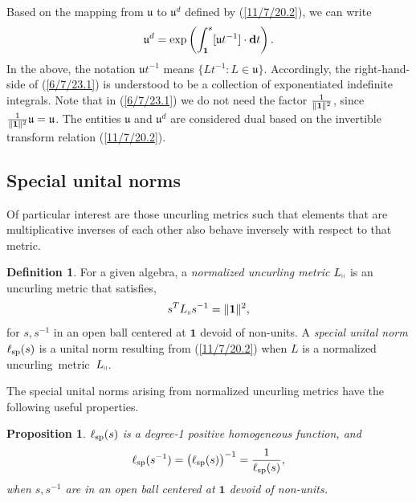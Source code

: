 \documentclass{amsart}
\newtheorem{proposition}[theorem]{Proposition}
\theoremstyle{definition}
\newtheorem{definition}[theorem]{Definition}
\numberwithin{theorem}{section}
\numberwithin{equation}{section}
\begin{document}
 Based on the mapping from $\mathfrak{u}$ to $\mathfrak{u}^d$ defined by (\ref{11/7/20.2}),  we can write \begin{equation}  \mathfrak{u}^d = \exp\left(\int_{\bf 1}^s [\mathfrak{u}t^{-1}]\cdot \mathbf{d}t\right). \label{6/7/23.1}\end{equation}  In the above, the notation $\mathfrak{u}t^{-1}$ means $\{Lt^{-1}: L\in \mathfrak{u}\}$.  Accordingly, the right-hand-side of (\ref{6/7/23.1}) is understood to be a collection of exponentiated indefinite integrals.   Note that in (\ref{6/7/23.1}) we do not need the factor $\frac{1}{\|{\bf 1}\|^2}$, since $\frac{1}{\|{\bf 1}\|^2}\mathfrak{u}=\mathfrak{u}$.  The entities  $\mathfrak{u}$ and $\mathfrak{u}^d$ are considered dual based on the invertible transform relation (\ref{11/7/20.2}).
  

\subsection{Special unital norms}
Of particular interest are those uncurling metrics such that elements that are multiplicative inverses of each other also behave inversely with respect to that metric.   
 
    \begin{definition}\label{9/20/23.1} For a given algebra, a {\it normalized uncurling metric} $L_{\shortparallel}$ is an uncurling metric that satisfies, \begin{equation} \label{7/7/21.1} s^TL_{\shortparallel} s^{-1} =\|{\bf 1}\|^2,\end{equation} for $s,s^{-1}$ in an open ball centered at $\mathbf{1}$ devoid of non-units.   A {\it special unital norm} $\ell_{\rm sp}(s)$ is a unital norm resulting from (\ref{11/7/20.2}) when $L$ is a normalized \mbox{uncurling metric $L_{\shortparallel}$}. 
\end{definition}

The special unital norms arising from normalized uncurling metrics have the following useful properties.
  
  \begin{proposition}\label{9/24/23.1} $ \ell_{\rm sp}(s)$ is a degree-1 positive homogeneous function, and
\begin{equation}\label{5/23/23.3}  \ell_{\rm sp}(s^{-1}) = \big(\ell_{\rm sp}(s)\big)^{-1} = \frac{1}{\ell_{\rm sp}(s)}, \end{equation} when $s,s^{-1}$ are in an open ball centered at $\mathbf{1}$ devoid of non-units. \end{proposition}
\end{document}
